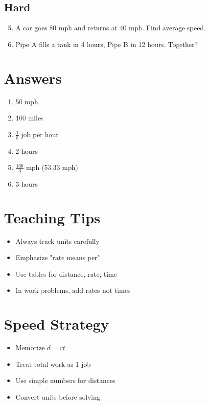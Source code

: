 \subsection*{Hard}
\begin{enumerate}
    \setcounter{enumi}{4}
    \item A car goes 80 mph and returns at 40 mph. Find average speed.
    \item Pipe A fills a tank in 4 hours, Pipe B in 12 hours. Together?
\end{enumerate}

\section*{Answers}
\begin{enumerate}
    \item 50 mph
    \item 100 miles
    \item $\frac{1}{8}$ job per hour
    \item 2 hours
    \item $\frac{160}{3}$ mph (53.33 mph)
    \item 3 hours
\end{enumerate}

\section*{Teaching Tips}
\begin{itemize}
    \item Always track units carefully
    \item Emphasize "rate means per"
    \item Use tables for distance, rate, time
    \item In work problems, add rates not times
\end{itemize}

\section*{Speed Strategy}
\begin{itemize}
    \item Memorize $d = rt$
    \item Treat total work as 1 job
    \item Use simple numbers for distances
    \item Convert units before solving
\end{itemize}
